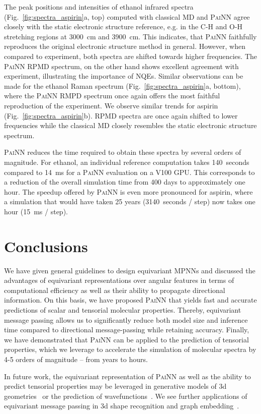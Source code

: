 \documentclass[reprint,
amsmath,amssymb,
 aip,jcp
]{revtex4-2}
\newcommand{\painn}{\textsc{PaiNN}}
\newcommand{\icm}{cm}
\newcommand{\new}[1]{#1}
\begin{document}
The peak positions and intensities of ethanol infrared spectra (Fig.~\ref{fig:spectra_aspirin}a, top) computed with classical MD and \new{\painn{}} agree closely with the static electronic structure reference, e.g. in the C-H and O-H stretching regions at 3000~\icm{} and 3900~\icm{}.
This indicates, that \painn{} faithfully reproduces the original electronic structure method in general.
However, when compared to experiment, both spectra are shifted towards higher frequencies.
The \painn{} RPMD spectrum, on the other hand shows excellent agreement with experiment, illustrating the importance of NQEs.
Similar observations can be made for the ethanol Raman spectrum (Fig.~\ref{fig:spectra_aspirin}a, bottom), where the \painn{} RMPD spectrum once again offers the most faithful reproduction of the experiment.
We observe similar trends for aspirin (Fig.~\ref{fig:spectra_aspirin}b).
RPMD spectra are once again shifted to lower frequencies while the classical MD closely resembles the static electronic structure spectrum.


\painn{} reduces the time required to obtain these spectra by several orders of magnitude.
For ethanol, an individual reference computation takes  140~seconds compared to 14~ms for a \painn{} evaluation on a V100 GPU.
This corresponds to a reduction of the overall simulation time from 400 days to approximately one hour.
The speedup offered by \painn{} is even more pronounced for aspirin, where a simulation that would have taken 25 years (3140~seconds / step) now takes one hour (15~ms / step).


\section{Conclusions}
We have given general guidelines to design equivariant MPNNs and discussed the advantages of equivariant representations over angular features in terms of computational efficiency as well as their ability to propagate directional information.
On this basis, we have proposed \painn{} that yields fast and accurate predictions of scalar and tensorial molecular properties.
Thereby, equivariant message passing allows us to significantly reduce both model size and inference time compared to directional message-passing while retaining accuracy.
Finally, we have demonstrated that \painn{} can be applied to the prediction of tensorial properties, which we leverage to accelerate the simulation of molecular spectra by 4-5 orders of magnitude -- from years to hours.

In future work, the equivariant representation of \painn{} as well as the ability to predict tensorial properties may be leveraged in generative models of 3d geometries~\cite{gebauer2019symmetry,kohler2019equivariant,simm2020symmetry} or the prediction of wavefunctions~\cite{hegde2017machine,schutt2019unifying,hermann2020deep}.
We see further applications of equivariant message passing in 3d shape recognition and graph embedding~\cite{goyal2018graph}.
\end{document}

